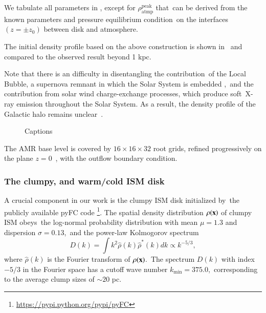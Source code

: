 \documentclass[twocolumn]{aastex631}
\begin{document}
  We tabulate all parameters in , except for $\rho_{\text{atmp}}^{\text{peak}}$ that\
  can be derived from the known parameters and pressure equilibrium condition\
  on the interfaces $(z=\pm z_{0})$ between disk and atmosphere.\

  The initial density profile based on the above construction is shown in \
  and compared to the observed result \citep{Miller_2013} beyond 1 kpc.\

  Note that there is an difficulty in disentangling the contribution\
  of the Local Bubble, a supernova remnant in which the Solar System is embedded \citep{Snowden1990},\
  and the contribution from solar wind charge-exchange processes, which produce soft\
  X-ray emission throughout the Solar System. As a result, the density profile of the Galactic halo remains unclear\
  \citep{BlandHawthorn2016}.


  \begin{figure}[h]
  \caption{Captions}
  \end{figure}


  The AMR base level is covered by $16\times16\times32$ root grids, refined progressively on the plane $z=0$\
  , with the outflow boundary condition.


  \subsubsection{The clumpy, and warm/cold ISM disk}

  A crucial component in our work is the clumpy ISM disk initialized by\
  the publicly available pyFC code
  \footnote{\url{https://pypi.python.org/pypi/pyFC}}.
  The spatial density distribution $\rho(\bold{x})$ of clumpy ISM obeys\
  the log-normal probability distribution \citep{Berkhuijsen2008} with mean $\mu=1.3$ and dispersion $\sigma=0.13$,\
  and the power-law Kolmogorov spectrum
  \begin{equation}
    D(k)=\int k^{2} \hat{\rho}(k)\hat{\rho}^{*}(k)dk \propto k^{-5/3},
  \end{equation}
  where $\hat{\rho}(k)$ is the Fourier transform of $\rho(\bold{x})$.\
  The spectrum $D(k)$ with index $-5/3$ in the Fourier space has a cutoff wave number $k_{\text{min}}=375.0$,\
  corresponding to the average clump sizes of $\sim 20$ pc.
\end{document}
